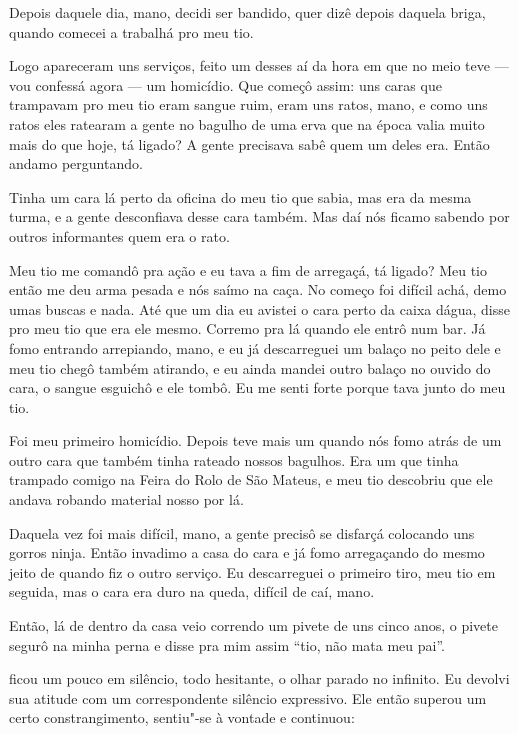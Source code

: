 Depois daquele dia, mano, decidi ser bandido, quer dizê depois daquela
briga, quando comecei a trabalhá pro meu tio.

Logo apareceram uns serviços, feito um desses aí da hora em que no meio
teve --- vou confessá agora --- um homicídio. Que começô assim: uns
caras que trampavam pro meu tio eram sangue ruim, eram uns ratos, mano,
e como uns ratos eles ratearam a gente no bagulho de uma erva que na
época valia muito mais do que hoje, tá ligado? A gente precisava sabê
quem um deles era. Então andamo perguntando.

Tinha um cara lá perto da oficina do meu tio que sabia, mas era da mesma
turma, e a gente desconfiava desse cara também. Mas daí nós ficamo
sabendo por outros informantes quem era o rato.

Meu tio me comandô pra ação e eu tava a fim de arregaçá, tá ligado? Meu
tio então me deu arma pesada e nós saímo na caça. No começo foi difícil
achá, demo umas buscas e nada. Até que um dia eu avistei o cara perto da
caixa dágua, disse pro meu tio que era ele mesmo. Corremo pra lá quando
ele entrô num bar. Já fomo entrando arrepiando, mano, e eu já
descarreguei um balaço no peito dele e meu tio chegô também atirando, e
eu ainda mandei outro balaço no ouvido do cara, o sangue esguichô e ele
tombô. Eu me senti forte porque tava junto do meu tio.

Foi meu primeiro homicídio. Depois teve mais um quando nós fomo atrás de
um outro cara que também tinha rateado nossos bagulhos. Era um que tinha
trampado comigo na Feira do Rolo de São Mateus, e meu tio descobriu que
ele andava robando material nosso por lá.

Daquela vez foi mais difícil, mano, a gente precisô se disfarçá
colocando uns gorros ninja. Então invadimo a casa do cara e já fomo
arregaçando do mesmo jeito de quando fiz o outro serviço. Eu
descarreguei o primeiro tiro, meu tio em seguida, mas o cara era duro na
queda, difícil de caí, mano.

Então, lá de dentro da casa veio correndo um pivete de uns cinco anos, o
pivete segurô na minha perna e disse pra mim assim ``tio, não mata meu
pai''.

\asterisc{}

 ficou um pouco em silêncio, todo hesitante, o olhar parado no
infinito. Eu devolvi sua atitude com um correspondente silêncio
expressivo. Ele então superou um certo constrangimento, sentiu"-se à
vontade e continuou:

\asterisc{}

